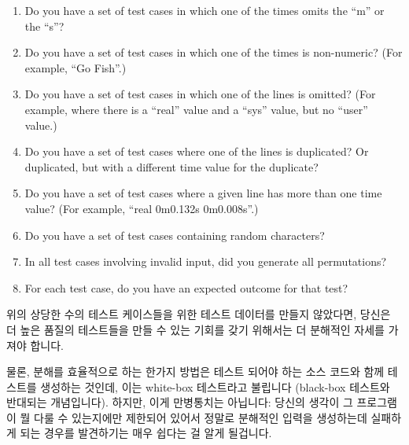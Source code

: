 {\begin{enumerate}
	\item	Do you have a set of test cases in which one of the
		times omits the ``m'' or the ``s''?
	\item	Do you have a set of test cases in which one of the
		times is non-numeric?  (For example, ``Go Fish''.)
	\item	Do you have a set of test cases in which one of the
		lines is omitted?  (For example, where there is a
		``real'' value and a ``sys'' value, but no ``user''
		value.)
	\item	Do you have a set of test cases where one of the
		lines is duplicated?  Or duplicated, but with a
		different time value for the duplicate?
	\item	Do you have a set of test cases where a given line
		has more than one time value?  (For example,
		``real 0m0.132s 0m0.008s''.)
	\item	Do you have a set of test cases containing random
		characters?
	\item	In all test cases involving invalid input, did you
		generate all permutations?
	\item	For each test case, do you have an expected outcome
		for that test?
	\fi
	\end{enumerate}

	위의 상당한 수의 테스트 케이스들을 위한 테스트 데이터를 만들지
	않았다면, 당신은 더 높은 품질의 테스트들을 만들 수 있는 기회를 갖기
	위해서는 더 분해적인 자세를 가져야 합니다.

	물론, 분해를 효율적으로 하는 한가지 방법은 테스트 되어야 하는 소스
	코드와 함께 테스트를 생성하는 것인데, 이는 white-box 테스트라고
	불립니다 (black-box 테스트와 반대되는 개념입니다).
	하지만, 이게 만병통치는 아닙니다: 당신의 생각이 그 프로그램이 뭘 다룰
	수 있는지에만 제한되어 있어서 정말로 분해적인 입력을 생성하는데
	실패하게 되는 경우를 발견하기는 매우 쉽다는 걸 알게 될겁니다.

} \QuickQuizEnd

